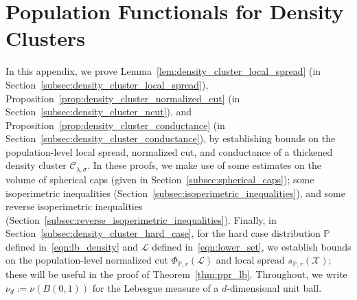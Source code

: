 \documentclass[twoside,11pt]{article}
\newcommand{\1}{\mathbf{1}}
\newcommand{\mc}[1]{\mathcal{#1}}
\newcommand{\Pbb}{\mathbb{P}}
\begin{document}
\section{Population Functionals for Density Clusters}
\label{apdx:density_cluster_population_functionals}
In this appendix, we prove Lemma~\ref{lem:density_cluster_local_spread} (in Section~\ref{subsec:density_cluster_local_spread}), Proposition~\ref{prop:density_cluster_normalized_cut} (in Section~\ref{subsec:density_cluster_ncut}), and Proposition~\ref{prop:density_cluster_conductance} (in Section~\ref{subsec:density_cluster_conductance}), by establishing bounds on the population-level local spread, normalized cut, and conductance of a thickened density cluster $\mc{C}_{\lambda,\sigma}$. In these proofs, we make use of some estimates on the volume of spherical caps (given in Section~\ref{subsec:spherical_caps}); some isoperimetric inequalities (Section~\ref{subsec:isoperimetric_inequalities}), and some reverse isoperimetric inequalities (Section~\ref{subsec:reverse_isoperimetric_inequalities}). Finally, in Section~\ref{subsec:density_cluster_hard_case}, for the hard case distribution $\Pbb$ defined in~\eqref{eqn:lb_density} and $\mc{L}$ defined in~\eqref{eqn:lower_set}, we establish bounds on the population-level normalized cut $\Phi_{\Pbb,r}(\mc{L})$ and local spread $s_{\Pbb,r}(\mc{X})$; these will be useful in the proof of Theorem~\ref{thm:ppr_lb}. Throughout, we write $\nu_d := \nu(B(0,1))$ for the Lebesgue measure of a $d$-dimensional unit ball.
\end{document}
